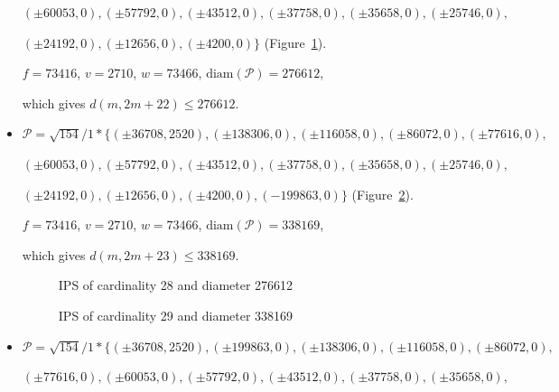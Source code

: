 \documentclass[12pt]{article}
\theoremstyle{theorem}
\theoremstyle{dfn}
\theoremstyle{remark}
\begin{document}
\begin{itemize}
$
(\pm 60053 , 0),
(\pm 57792 , 0),
(\pm 43512 , 0),
(\pm 37758 , 0),
(\pm 35658 , 0),
(\pm 25746 , 0),
$

$
(\pm 24192 , 0),
(\pm 12656 , 0),
(\pm 4200 , 0)\}
$
(Figure~\ref{picture_24.png}).

$f = 73416$, $v = 2710$, $w = 73466$, $\operatorname{diam(\mathcal{P})} = 276612$,

which gives $d(m, 2m + 22) \leq 276612$.


\item
$\mathcal{P}=\sqrt{154}/{1} * \{ (\pm 36708, 2520),
(\pm 138306 , 0),
(\pm 116058 , 0),
(\pm 86072 , 0),
(\pm 77616 , 0),
$

$
(\pm 60053 , 0),
(\pm 57792 , 0),
(\pm 43512 , 0),
(\pm 37758 , 0),
(\pm 35658 , 0),
(\pm 25746 , 0),
$

$
(\pm 24192 , 0),
(\pm 12656 , 0),
(\pm 4200 , 0),
(-199863 , 0)\}
$
(Figure~\ref{picture_25.png}).

$f = 73416$, $v = 2710$, $w = 73466$, $\operatorname{diam(\mathcal{P})} = 338169$,

which gives $d(m, 2m + 23) \leq 338169$.


\begin{figure}[h!]
\parbox{1\linewidth}{\caption{IPS of cardinality 28 and diameter 276612}
\label{picture_24.png}}
\end{figure}


\begin{figure}[h!]
\parbox{1\linewidth}{\caption{IPS of cardinality 29 and diameter 338169}
\label{picture_25.png}}
\end{figure}


\item
$\mathcal{P}=\sqrt{154}/{1} * \{ (\pm 36708, 2520),
(\pm 199863 , 0),
(\pm 138306 , 0),
(\pm 116058 , 0),
(\pm 86072 , 0),
$

$
(\pm 77616 , 0),
(\pm 60053 , 0),
(\pm 57792 , 0),
(\pm 43512 , 0),
(\pm 37758 , 0),
(\pm 35658 , 0),
$


\end{itemize}
\end{document}
